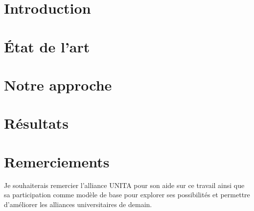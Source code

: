 \documentclass{cnriut} %
\begin{document}
\creationEnTete        %

\section{Introduction}


\section{État de l'art}


\section{Notre approche}


\section{Résultats}


\section{Remerciements}
Je souhaiterais remercier l'alliance UNITA pour son aide sur ce travail ainsi que sa participation comme modèle de base pour explorer ses possibilités et permettre d'améliorer les alliances universitaires de demain.

\printbibliography
\end{document}
